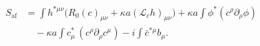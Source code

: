\begin{align}
\label{eq:Saf-expanded}
S_{\mathrm{af}}
&=\int h^{*\mu\nu}\bigl(R_0(c)_{\mu\nu}+\kappa a(\mathcal L_ch)_{\mu\nu}\bigr)
+\kappa a\int\phi^*(c^\rho\partial_\rho\phi)
\nonumber\\
&\quad
-\kappa a\int c^*_\mu\,(c^\rho\partial_\rho c^\mu)
-i\int\bar c^{*\mu}b_\mu.
\end{align}